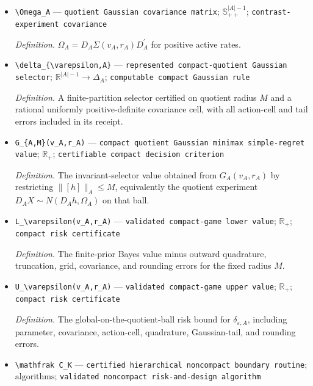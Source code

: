 \documentclass{article}
\begin{document}
\begin{itemize}
  \item \texttt{\textbackslash{}\allowbreak{}Omega\_\allowbreak{}A} --- \texttt{quotient Gaussian covariance matrix}; \(\mathbb S_{++}^{|A|-1}\); \texttt{contrast-\allowbreak{}experiment covariance}
  \par\smallskip\noindent\emph{Definition.} \(\Omega_A=D_A\Sigma(v_A,r_A)D_A^{\prime}\) for positive active rates.
  \item \texttt{\textbackslash{}\allowbreak{}delta\_\allowbreak{}\{\textbackslash{}\allowbreak{}varepsilon,\allowbreak{}A\}\allowbreak{}} --- \texttt{represented compact-\allowbreak{}quotient Gaussian selector}; \(\mathbb R^{|A|-1}\to\Delta_A\); \texttt{computable compact Gaussian rule}
  \par\smallskip\noindent\emph{Definition.} A finite-partition selector certified on quotient radius \(M\) and a rational uniformly positive-definite covariance cell, with all action-cell and tail errors included in its receipt.
  \item \texttt{G\_\allowbreak{}\{A,\allowbreak{}M\}\allowbreak{}(v\_\allowbreak{}A,\allowbreak{}r\_\allowbreak{}A)} --- \texttt{compact quotient Gaussian minimax simple-\allowbreak{}regret value}; \(\mathbb R_+\); \texttt{certifiable compact decision criterion}
  \par\smallskip\noindent\emph{Definition.} The invariant-selector value obtained from \(G_A(v_A,r_A)\) by restricting \(\lVert[h]\rVert_A\leq M\), equivalently the quotient experiment \(D_AX\sim N(D_Ah,\Omega_A)\) on that ball.
  \item \texttt{L\_\allowbreak{}\textbackslash{}\allowbreak{}varepsilon(v\_\allowbreak{}A,\allowbreak{}r\_\allowbreak{}A)} --- \texttt{validated compact-\allowbreak{}game lower value}; \(\mathbb R_+\); \texttt{compact risk certificate}
  \par\smallskip\noindent\emph{Definition.} The finite-prior Bayes value minus outward quadrature, truncation, grid, covariance, and rounding errors for the fixed radius \(M\).
  \item \texttt{U\_\allowbreak{}\textbackslash{}\allowbreak{}varepsilon(v\_\allowbreak{}A,\allowbreak{}r\_\allowbreak{}A)} --- \texttt{validated compact-\allowbreak{}game upper value}; \(\mathbb R_+\); \texttt{compact risk certificate}
  \par\smallskip\noindent\emph{Definition.} The global-on-the-quotient-ball risk bound for \(\delta_{\varepsilon,A}\), including parameter, covariance, action-cell, quadrature, Gaussian-tail, and rounding errors.
  \item \texttt{\textbackslash{}\allowbreak{}mathfrak C\_\allowbreak{}K} --- \texttt{certified hierarchical noncompact boundary routine}; \(\text{algorithms}\); \texttt{validated noncompact risk-\allowbreak{}and-\allowbreak{}design algorithm}

\end{itemize}
\end{document}
